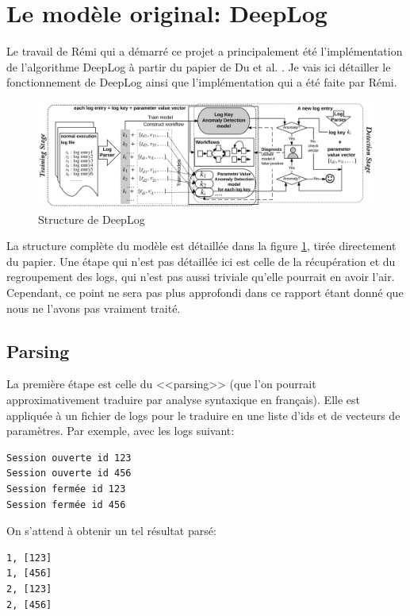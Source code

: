 \documentclass[openany, 11pt]{memoir}
\begin{document}
\newpage
\section{Le modèle original: DeepLog}
\label{sectiondeeplog}

Le travail de Rémi qui a démarré ce projet a principalement été l'implémentation de l'algorithme DeepLog à partir du papier de Du et al. \cite{deeplog}. Je vais ici détailler le fonctionnement de DeepLog ainsi que l'implémentation qui a été faite par Rémi.

\begin{figure}[ht]
	\centering
	\includegraphics[width=\textwidth]{images/deeplog.png}
	\caption{Structure de DeepLog}
	\label{deeplog}
\end{figure}

La structure complète du modèle est détaillée dans la figure \ref{deeplog}, tirée directement du papier. Une étape qui n'est pas détaillée ici est celle de la récupération et du regroupement des \glspl{log}, qui n'est pas aussi triviale qu'elle pourrait en avoir l'air. Cependant, ce point ne sera pas plus approfondi dans ce rapport étant donné que nous ne l'avons pas vraiment traité.

\subsection{Parsing}

La première étape est celle du <<parsing>> (que l'on pourrait approximativement traduire par analyse syntaxique en français). Elle est appliquée à un fichier de \glspl{log} pour le traduire en une liste d'ids et de vecteurs de paramètres. Par exemple, avec les logs suivant:

\begin{lstlisting}
Session ouverte id 123
Session ouverte id 456
Session fermée id 123
Session fermée id 456
\end{lstlisting}

On s'attend à obtenir un tel résultat parsé:

\begin{lstlisting}
1, [123]
1, [456]
2, [123]
2, [456]
\end{lstlisting}
\end{document}

